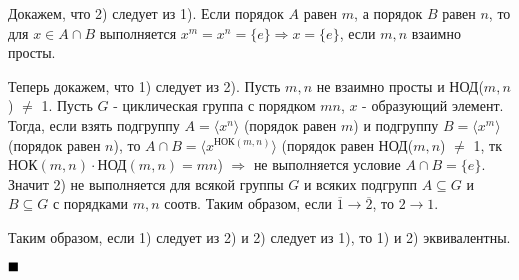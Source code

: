 \documentclass[a4paper, 16pt]{article}
\newenvironment{proof}[1][Доказательство]{%
	\begin{trivlist}
		\item[\hskip \labelsep {\bfseries #1:}]
		\item \hspace{14pt}
	}{
		$ \hfill\blacksquare $
	\end{trivlist}
	\hfill\break
}
\begin{document}
	\begin{proof}
		Докажем, что 2) следует из 1). Если порядок $A$ равен $m$, а порядок $B$ равен $n$, то для $x \in A \cap B$ выполняется $x^m = x^n = \{e\} \Rightarrow x = \{e\}$, если $m, n$ взаимно просты.
		
		Теперь докажем, что 1) следует из 2). Пусть $m, n$ не взаимно просты и НОД($m, n$) $\ne$ 1. Пусть $G$ - циклическая группа с порядком $mn$, $x$ - образующий элемент. Тогда, если взять подгруппу $A = \langle x^n \rangle$ (порядок равен $m$) и  подгруппу $B = \langle x^m \rangle$ (порядок равен $n$), то  $A \cap B = \langle x^{\text{НОК}(m, n)} \rangle$ (порядок равен НОД($m, n$) $\ne$ 1, тк $\text{НОК}(m, n) \cdot \text{НОД}(m, n) = mn$) $\Rightarrow$ не выполняется условие $A \cap B = \{e\}$. Значит 2) не выполняется для всякой группы $G$ и всяких подгрупп $A \subseteq  G$ и $B \subseteq G$ с порядками $m, n$ соотв. Таким образом, если $\overline{1} \to \overline{2}$, то $2\to1$.
		
		Таким образом, если 1) следует из 2) и 2) следует из 1), то 1) и 2) эквивалентны.
	\end{proof}
	
	
	
	
	
	
	
\end{document}
